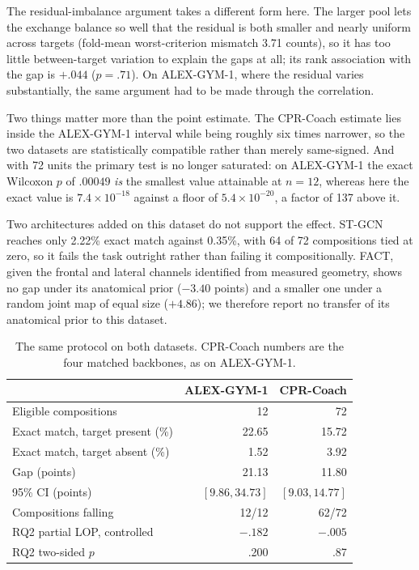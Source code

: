 \documentclass[conference,a4paper]{IEEEtran}
\begin{document}
The residual-imbalance argument takes a different form here. The larger pool
lets the exchange balance so well that the residual is both smaller and nearly
uniform across targets (fold-mean worst-criterion mismatch 3.71 counts), so it
has too little between-target variation to explain the gaps at all; its rank
association with the gap is $+.044$ ($p=.71$). On ALEX-GYM-1, where the residual
varies substantially, the same argument had to be made through the correlation.

Two things matter more than the point estimate. The CPR-Coach estimate lies
inside the ALEX-GYM-1 interval while being roughly six times narrower, so the
two datasets are statistically compatible rather than merely same-signed. And
with 72 units the primary test is no longer saturated: on ALEX-GYM-1 the exact
Wilcoxon $p$ of $.00049$ \emph{is} the smallest value attainable at $n=12$,
whereas here the exact value is $7.4\times10^{-18}$ against a floor of
$5.4\times10^{-20}$, a factor of 137 above it.

Two architectures added on this dataset do not support the effect. ST-GCN
reaches only 2.22\% exact match against 0.35\%, with 64 of 72 compositions tied
at zero, so it fails the task outright rather than failing it compositionally.
FACT, given the frontal and lateral channels identified from measured geometry,
shows no gap under its anatomical prior ($-3.40$ points) and a smaller one under
a random joint map of equal size ($+4.86$); we therefore report no transfer of
its anatomical prior to this dataset.

\begin{table}[t]
\centering
\caption{The same protocol on both datasets. CPR-Coach numbers are the four
matched backbones, as on ALEX-GYM-1.}
\label{tab:replication}
\small
\setlength{\tabcolsep}{4pt}
\begin{tabular}{lrr}
\toprule
& ALEX-GYM-1 & CPR-Coach\\
\midrule
Eligible compositions & 12 & 72\\
Exact match, target present (\%) & 22.65 & 15.72\\
Exact match, target absent (\%) & 1.52 & 3.92\\
Gap (points) & 21.13 & 11.80\\
95\% CI (points) & $[9.86,34.73]$ & $[9.03,14.77]$\\
Compositions falling & 12/12 & 62/72\\
\midrule
RQ2 partial LOP, controlled & $-.182$ & $-.005$\\
RQ2 two-sided $p$ & .200 & .87\\
\bottomrule
\end{tabular}
\end{table}
\end{document}
